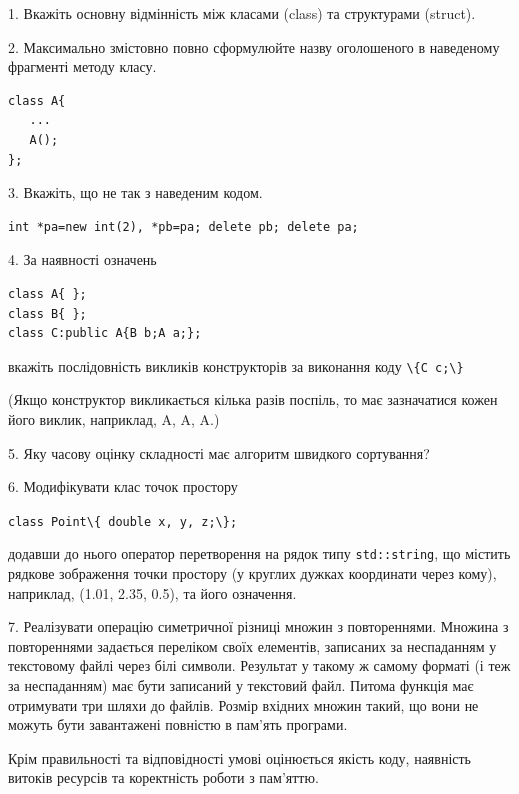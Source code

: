 \documentclass[12pt, ukrainian]{article}
\def\code#1{\Verb!#1!}
\begin{document}
{%
1. Вкажіть основну відмінність між класами (class) та структурами (struct).%
\par
\vspace{2mm}
2. Максимально змістовно повно сформулюйте назву оголошеного в наведеному фрагменті методу класу.
\vspace{-3mm}
\begin{verbatim}class A{
   ...
   A();
};\end{verbatim}
\vspace{-3mm}
\par
\vspace{2mm}
3. Вкажіть, що не так з наведеним кодом.
\vspace{-3mm}
\begin{verbatim}int *pa=new int(2), *pb=pa; delete pb; delete pa;\end{verbatim}
\vspace{-3mm}
\par
\vspace{2mm}
4. За наявності означень
\vspace{-3mm}
\begin{verbatim}
class A{ };
class B{ };
class C:public A{B b;A a;};\end{verbatim}
\vspace{-3mm}
вкажіть послідовність викликів конструкторів за виконання коду \code{\{C c;\}} 

(Якщо конструктор викликається кілька разів поспіль, то має зазначатися кожен його виклик, наприклад, A, A, A.)

\vspace{2mm}
5. Яку часову оцінку складності має алгоритм швидкого сортування?
\par
\vspace{2mm}
6. Модифікувати клас точок простору 

\qquad\code{class Point\{ double x, y, z;\};}


додавши до нього оператор перетворення на рядок типу \code{std::string}, що містить рядкове зображення точки простору (у круглих дужках координати через кому), наприклад, (1.01, 2.35, 0.5), та його означення.%
\par
\vspace{2mm}
7. 
Реалізувати операцію симетричної різниці множин з повтореннями. Множина з повтореннями задається переліком своїх елементів, записаних за неспаданням у текстовому файлі через білі символи. Результат у такому ж самому форматі (і теж за неспаданням) має бути записаний у текстовий файл. Питома функція має отримувати три шляхи до файлів. Розмір вхідних множин такий, що вони не можуть бути завантажені повністю в пам’ять програми.

Крім правильності та відповідності умові оцінюється якість коду, наявність витоків ресурсів та коректність роботи з пам'яттю. 

}
\end{document}

